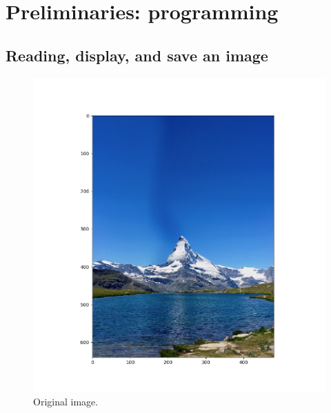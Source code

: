 \documentclass[11pt]{article}
\begin{document}
\section{Preliminaries: programming} %
\subsection{Reading, display, and save an image} %
\begin{figure}[h]
	\begin{minipage}{0.5 \textwidth}
		\centering
		\includegraphics[width=1 \textwidth]{figures/original.png}
		\caption{Original image.}
	\end{minipage}
	\begin{minipage}{0.5 \textwidth}
		\centering

\end{minipage}
\end{figure}
\end{document}
